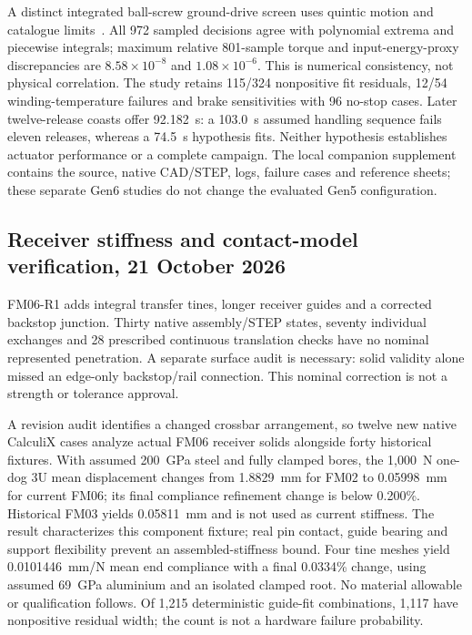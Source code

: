 \documentclass[conference]{IEEEtran}
\begin{document}
A distinct integrated ball-screw ground-drive screen uses quintic motion and catalogue limits~\cite{faulhaber32lsb,faulhaber3242}. All 972 sampled decisions agree with polynomial extrema and piecewise integrals; maximum relative 801-sample torque and input-energy-proxy discrepancies are $8.58\times10^{-8}$ and $1.08\times10^{-6}$. This is numerical consistency, not physical correlation. The study retains 115/324 nonpositive fit residuals, 12/54 winding-temperature failures and brake sensitivities with 96 no-stop cases. Later twelve-release coasts offer 92.182~s: a 103.0~s assumed handling sequence fails eleven releases, whereas a 74.5~s hypothesis fits. Neither hypothesis establishes actuator performance or a complete campaign. The local companion supplement contains the source, native CAD/STEP, logs, failure cases and reference sheets; these separate Gen6 studies do not change the evaluated Gen5 configuration.


\subsection{Receiver stiffness and contact-model verification, 21 October 2026}
FM06-R1 adds integral transfer tines, longer receiver guides and a corrected backstop junction. Thirty native assembly/STEP states, seventy individual exchanges and 28 prescribed continuous translation checks have no nominal represented penetration. A separate surface audit is necessary: solid validity alone missed an edge-only backstop/rail connection. This nominal correction is not a strength or tolerance approval.

A revision audit identifies a changed crossbar arrangement, so twelve new native CalculiX cases analyze actual FM06 receiver solids alongside forty historical fixtures. With assumed 200~GPa steel and fully clamped bores, the 1,000~N one-dog 3U mean displacement changes from 1.8829~mm for FM02 to 0.05998~mm for current FM06; its final compliance refinement change is below 0.200\%. Historical FM03 yields 0.05811~mm and is not used as current stiffness. The result characterizes this component fixture; real pin contact, guide bearing and support flexibility prevent an assembled-stiffness bound. Four tine meshes yield 0.0101446~mm/N mean end compliance with a final 0.0334\% change, using assumed 69~GPa aluminium and an isolated clamped root. No material allowable or qualification follows. Of 1,215 deterministic guide-fit combinations, 1,117 have nonpositive residual width; the count is not a hardware failure probability.
\end{document}
